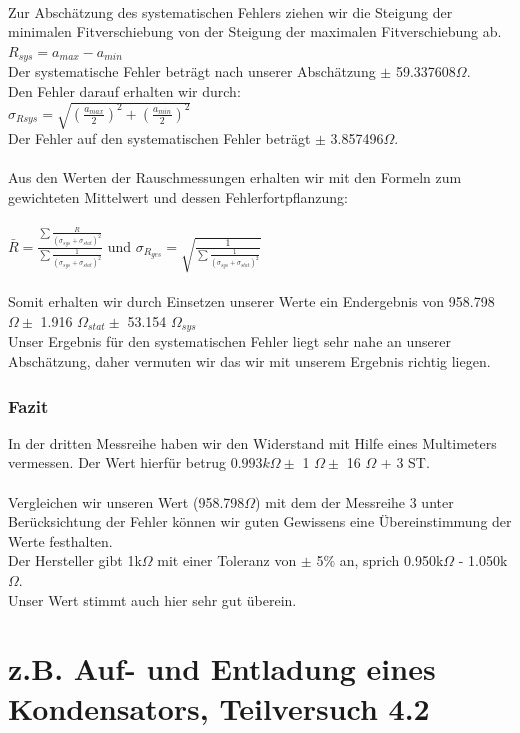 \documentclass[12pt,a4paper]{article}
\begin{document}
\\Zur Abschätzung des systematischen Fehlers ziehen wir die Steigung der minimalen Fitverschiebung von der Steigung der maximalen Fitverschiebung ab.\\  
$R_{sys} = a_{max} - a_{min}$\\
Der systematische Fehler beträgt nach unserer Abschätzung $\pm$ 59.337608$\Omega$.\\ 
Den Fehler darauf erhalten wir durch:\\
$\sigma_{R sys} = \sqrt{(\frac{a_{max}}{2})^2+(\frac{a_{min}}{2})^2}$\\
Der Fehler auf den systematischen Fehler beträgt $\pm$ 3.857496$\Omega$.\\
\\Aus den Werten der Rauschmessungen erhalten wir mit den Formeln zum gewichteten Mittelwert und dessen Fehlerfortpflanzung:\\
\\$\bar{R} = \frac{\sum{\frac{R}{(\sigma_{sys}+\sigma_{stat})^2}}}{\sum{\frac{1}{(\sigma_{sys}+\sigma_{stat})^2}}}$ und $\sigma_{R_{ges}} = \sqrt{\frac{1}{\sum{\frac{1}{(\sigma_{sys}+\sigma_{stat})^2}}}}$\\
\\Somit erhalten wir durch Einsetzen unserer Werte ein Endergebnis von 958.798$\Omega \pm$ 1.916 $\Omega_{stat} \pm$ 53.154 $\Omega_{sys}$\\
Unser Ergebnis für den systematischen Fehler liegt sehr nahe an unserer Abschätzung, daher vermuten wir das wir mit unserem Ergebnis richtig liegen.\\ 
\subsubsection{Fazit}
In der dritten Messreihe haben wir den Widerstand mit Hilfe eines Multimeters vermessen. Der Wert hierfür betrug $0.993 k\Omega \pm$ 1 $\Omega \pm$ 16 $\Omega$ + 3 ST. \\ 
\\Vergleichen wir unseren Wert (958.798$\Omega$) mit dem der Messreihe 3 unter Berücksichtung der Fehler können wir guten Gewissens eine Übereinstimmung der Werte festhalten. 
\\Der Hersteller gibt 1k$\Omega$ mit einer Toleranz von $\pm$ 5\% an, sprich 0.950k$\Omega$ - 1.050k$\Omega$. 
\\Unser Wert stimmt auch hier sehr gut überein.  
\section{z.B. Auf- und Entladung eines Kondensators, Teilversuch 4.2}
\end{document}
